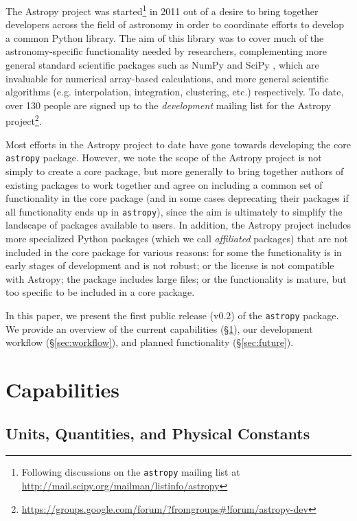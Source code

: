 \documentclass[traditabstract]{aa}
\newcommand{\astropy}{\texttt{astropy}\xspace}
\begin{document}
The Astropy project was started\footnote{Following discussions on
the \texttt{astropy} mailing list at
\url{http://mail.scipy.org/mailman/listinfo/astropy}} in 2011 out of a desire
to bring together developers across the field of astronomy in order to
coordinate efforts to develop a common Python library. The aim of this library
was to cover much of the astronomy-specific functionality needed by
researchers, complementing more general standard scientific packages such as
NumPy \citep{oliphant2006guide,van2011numpy} and SciPy \citep{jones2001scipy},
which are invaluable for numerical array-based calculations, and more general
scientific algorithms (e.g. interpolation, integration, clustering, etc.)
respectively. To date, over 130 people are signed up to the
\textit{development} mailing list for the Astropy project\footnote{
\url{https://groups.google.com/forum/?fromgroups\#!forum/astropy-dev}}.

Most efforts in the Astropy project to date have gone towards developing the
core \astropy package. However, we note the scope of the Astropy project is
not simply to create a core package, but more generally to bring together
authors of existing packages to work together and agree on including a common
set of functionality in the core package (and in some cases deprecating their
packages if all functionality ends up in \astropy), since the aim is
ultimately to simplify the landscape of packages available to users. In
addition, the Astropy project includes more specialized Python packages (which
we call \textit{affiliated} packages) that are not included in the core
package for various reasons: for some the functionality is in early stages of
development and is not robust; or the license is not compatible with Astropy;
the package includes large files; or the functionality is mature, but too
specific to be included in a core package.


In this paper, we present the first public release (v0.2) of the \astropy
package. We provide an overview of the current capabilities
(\S\ref{sec:capabilities}), our development workflow (\S\ref{sec:workflow}),
and planned functionality (\S\ref{sec:future}).


\section{Capabilities}

\label{sec:capabilities}


\subsection{Units, Quantities, and Physical Constants}
\end{document}
